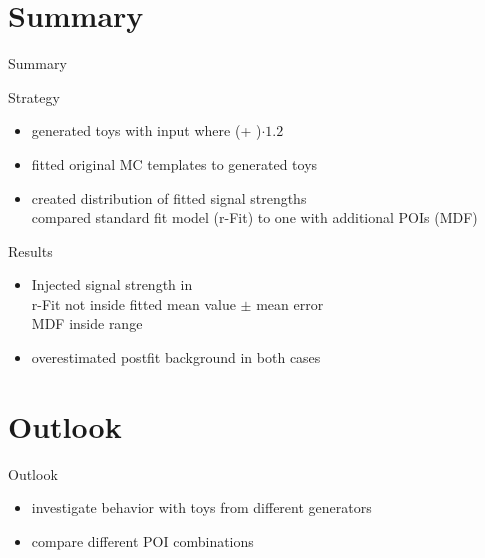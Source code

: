\section{Summary}
\begin{frame}{Summary}
\begin{block}{Strategy}
\begin{itemize}
\item generated toys with input where (\ttbar + \bbbar)$\cdot \num[round-precision=1]{1.2}$\\
\item fitted original MC templates to generated toys
\item created distribution of fitted signal strengths\\
\rar compared standard fit model (r-Fit) to one with additional POIs (MDF)
\end{itemize}
\end{block}
\begin{block}{Results}
\begin{itemize}
\item Injected signal strength in \\
\rar r-Fit not inside fitted mean value $\pm$ mean error\\
\rar MDF inside range
\item overestimated postfit background in both cases
\end{itemize}
\end{block}
\end{frame}

\section{Outlook}
\begin{frame}{Outlook}
\begin{itemize}
\item investigate behavior with toys from different generators
\item compare different POI combinations
\end{itemize}
\end{frame}